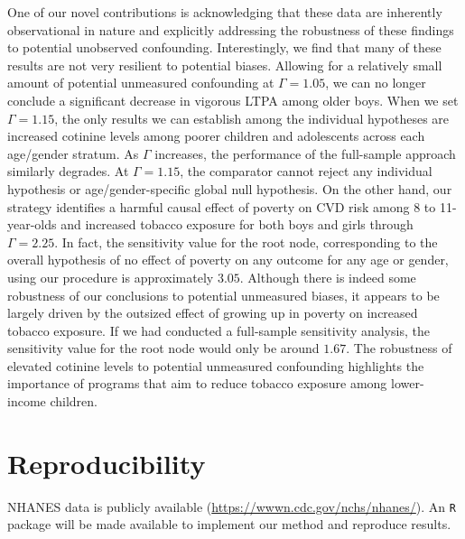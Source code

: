 \documentclass[12pt,leqno,titlepage]{amsart}
\newcommand{\1}{\mathbbm{1}}
\let\orignewpage\newpage
\renewcommand\newpage{}
\begin{document}
\begin{bibunit}
One of our novel contributions
is acknowledging that these data are inherently observational in nature and explicitly addressing the robustness of these findings to potential unobserved confounding. Interestingly, we find that many of these results are not very resilient to potential biases. Allowing for a relatively small amount of potential unmeasured confounding at $\Gamma = 1.05$, we can no longer conclude a significant decrease in vigorous LTPA among older boys. When we set $\Gamma=1.15$, the only results we can establish among the individual hypotheses are increased cotinine levels among poorer children and adolescents across each age/gender stratum. As $\Gamma$ increases, the performance of the full-sample approach similarly degrades. At $\Gamma=1.15$, the comparator cannot reject any individual hypothesis or age/gender-specific global null hypothesis. On the other hand, our strategy identifies a harmful causal effect of poverty on CVD risk among 8 to 11-year-olds and increased tobacco exposure for both boys and girls through $\Gamma = 2.25$.  In fact, the sensitivity value for the root node, corresponding to the overall hypothesis of no effect of poverty on any outcome for any age or gender, using our procedure is approximately $3.05$. Although there is indeed some robustness of our conclusions to potential unmeasured biases, it appears to be largely driven by the outsized effect of growing up in poverty on increased tobacco exposure. If we had conducted a full-sample sensitivity analysis, the sensitivity value for the root node would only be around $1.67$. The robustness of elevated cotinine levels to potential unmeasured confounding highlights the importance of programs that aim to reduce tobacco exposure among lower-income children.%






\section{Reproducibility}
NHANES data is publicly available (\url{https://wwwn.cdc.gov/nchs/nhanes/}). An \texttt{R} package will be made available to implement our method and reproduce results.



\renewcommand{\refname}{References}
\putbib

\end{bibunit}


\orignewpage
\appendix
\end{document}
